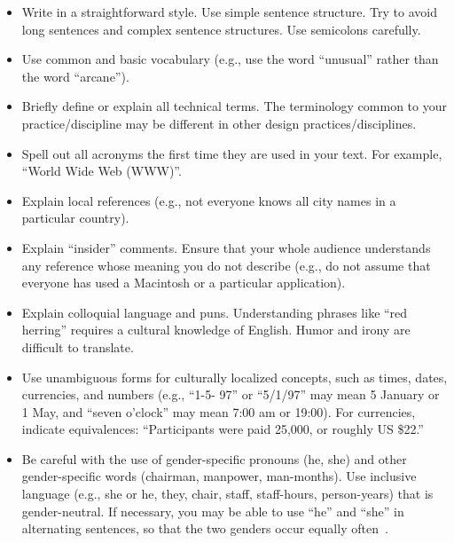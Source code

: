 \documentclass{sigchi-ext}
\begin{document}
    \begin{itemize}\compresslist%
    \item Write in a straightforward style. Use simple sentence
      structure. Try to avoid long sentences and complex sentence
      structures. Use semicolons carefully.
    \item Use common and basic vocabulary (e.g., use the word ``unusual''
      rather than the word ``arcane'').
    \item Briefly define or explain all technical terms. The terminology
      common to your practice/discipline may be different in other design
      practices/disciplines.
    \item Spell out all acronyms the first time they are used in your
      text. For example, ``World Wide Web (WWW)''.
    \item Explain local references (e.g., not everyone knows all city
      names in a particular country).
    \item Explain ``insider'' comments. Ensure that your whole audience
      understands any reference whose meaning you do not describe (e.g.,
      do not assume that everyone has used a Macintosh or a particular
      application).
    \item Explain colloquial language and puns. Understanding phrases like
      ``red herring'' requires a cultural knowledge of English. Humor and
      irony are difficult to translate.
    \item Use unambiguous forms for culturally localized concepts, such as
      times, dates, currencies, and numbers (e.g., ``1-5- 97'' or
      ``5/1/97'' may mean 5 January or 1 May, and ``seven o'clock'' may
      mean 7:00 am or 19:00). For currencies, indicate equivalences:
      ``Participants were paid {\selectfont \textwon}
      25,000, or roughly US \$22.''
    \item Be careful with the use of gender-specific pronouns (he, she)
      and other gender-specific words (chairman, manpower,
      man-months). Use inclusive language (e.g., she or he, they, chair,
      staff, staff-hours, person-years) that is gender-neutral. If
      necessary, you may be able to use ``he'' and ``she'' in alternating
      sentences, so that the two genders occur equally
      often~\cite{Schwartz:1995:GBF}.
    \end{itemize}
    
    
\end{document}
